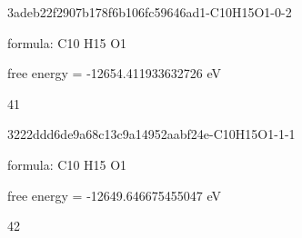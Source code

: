 \documentclass{article}
\begin{document}
\vspace{1cm}


3adeb22f2907b178f6b106fc59646ad1-C10H15O1-0-2



formula: C10 H15 O1



free energy = -12654.411933632726 eV

41

\vspace{1cm}


3222ddd6de9a68c13c9a14952aabf24e-C10H15O1-1-1



formula: C10 H15 O1



free energy = -12649.646675455047 eV

42
\end{document}
